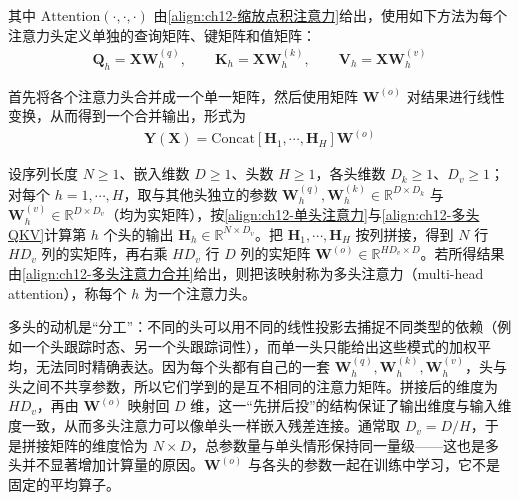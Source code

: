 \documentclass[../../main.tex]{subfiles}
\begin{document}
其中 $\mathrm{Attention}(\cdot,\cdot,\cdot)$ 由\eqref{align:ch12-缩放点积注意力}给出，使用如下方法为每个注意力头定义单独的查询矩阵、键矩阵和值矩阵：
\begin{align}
\mathbf{Q}_h=\mathbf{X}\mathbf{W}_h^{(q)},\qquad
\mathbf{K}_h=\mathbf{X}\mathbf{W}_h^{(k)},\qquad
\mathbf{V}_h=\mathbf{X}\mathbf{W}_h^{(v)}
\label{align:ch12-多头QKV}
\end{align}

首先将各个注意力头合并成一个单一矩阵，然后使用矩阵 $\mathbf{W}^{(o)}$ 对结果进行线性变换，从而得到一个合并输出，形式为
\begin{align}
\mathbf{Y}(\mathbf{X})=\mathrm{Concat}\left[\mathbf{H}_1,\cdots,\mathbf{H}_H\right]\mathbf{W}^{(o)}
\label{align:ch12-多头注意力合并}
\end{align}

\begin{definition}[多头注意力]\label{definition:ch12-多头注意力}
设序列长度 $N\geqslant1$、嵌入维数 $D\geqslant1$、头数 $H\geqslant1$，各头维数 $D_k\geqslant1$、$D_v\geqslant1$；对每个 $h=1,\cdots,H$，取与其他头独立的参数 $\mathbf{W}_h^{(q)},\mathbf{W}_h^{(k)}\in\mathbb{R}^{D\times D_k}$ 与 $\mathbf{W}_h^{(v)}\in\mathbb{R}^{D\times D_v}$（均为实矩阵），按\eqref{align:ch12-单头注意力}与\eqref{align:ch12-多头QKV}计算第 $h$ 个头的输出 $\mathbf{H}_h\in\mathbb{R}^{N\times D_v}$。把 $\mathbf{H}_1,\cdots,\mathbf{H}_H$ 按列拼接，得到 $N$ 行 $HD_v$ 列的实矩阵，再右乘 $HD_v$ 行 $D$ 列的实矩阵 $\mathbf{W}^{(o)}\in\mathbb{R}^{HD_v\times D}$。若所得结果由\eqref{align:ch12-多头注意力合并}给出，则把该映射称为多头注意力（multi-head attention），称每个 $h$ 为一个注意力头。
\end{definition}

\begin{remark}
多头的动机是“分工”：不同的头可以用不同的线性投影去捕捉不同类型的依赖（例如一个头跟踪时态、另一个头跟踪词性），而单一头只能给出这些模式的加权平均，无法同时精确表达。因为每个头都有自己的一套 $\mathbf{W}_h^{(q)},\mathbf{W}_h^{(k)},\mathbf{W}_h^{(v)}$，头与头之间不共享参数，所以它们学到的是互不相同的注意力矩阵。拼接后的维度为 $HD_v$，再由 $\mathbf{W}^{(o)}$ 映射回 $D$ 维，这一“先拼后投”的结构保证了输出维度与输入维度一致，从而多头注意力可以像单头一样嵌入残差连接。通常取 $D_v=D/H$，于是拼接矩阵的维度恰为 $N\times D$，总参数量与单头情形保持同一量级——这也是多头并不显著增加计算量的原因。$\mathbf{W}^{(o)}$ 与各头的参数一起在训练中学习，它不是固定的平均算子。
\end{remark}
\end{document}
